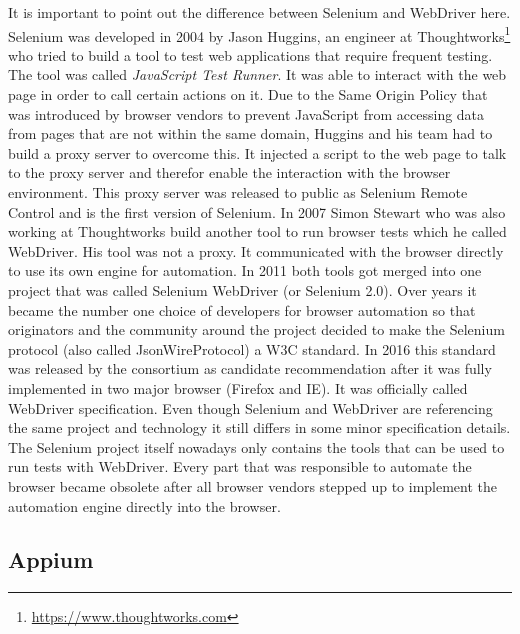 It is important to point out the difference between Selenium and WebDriver here. Selenium was
developed in 2004 by Jason Huggins, an engineer at Thoughtworks\footnote{\url{https://www.thoughtworks.com}}
who tried to build a tool to test web applications that require frequent testing. The tool
was called \textit{JavaScript Test Runner}. It was able to interact with the web page in order
to call certain actions on it. Due to the Same Origin Policy that was introduced by browser
vendors to prevent JavaScript from accessing data from pages that are not within the same domain,
Huggins and his team had to build a proxy server to overcome this. It injected a script to the
web page to talk to the proxy server and therefor enable the interaction with the browser environment.
This proxy server was released to public as Selenium Remote Control and is the first version of
Selenium. In 2007 Simon Stewart who was also working at Thoughtworks build another tool to run
browser tests which he called WebDriver. His tool was not a proxy. It communicated with the
browser directly to use its own engine for automation. In 2011 both tools got merged into one
project that was called Selenium WebDriver (or Selenium 2.0). Over years it became the number
one choice of developers for browser automation so that originators and the community around
the project decided to make the Selenium protocol (also called JsonWireProtocol) a W3C standard.
In 2016 this standard was released by the consortium as candidate recommendation after it was
fully implemented in two major browser (Firefox and IE). It was officially called WebDriver
specification. Even though Selenium and WebDriver are referencing the same project and technology
it still differs in some minor specification details. The Selenium project itself nowadays only
contains the tools that can be used to run tests with WebDriver. Every part that was responsible
to automate the browser became obsolete after all browser vendors stepped up to implement the
automation engine directly into the browser.

\subsection{Appium\label{sec:appium}}

